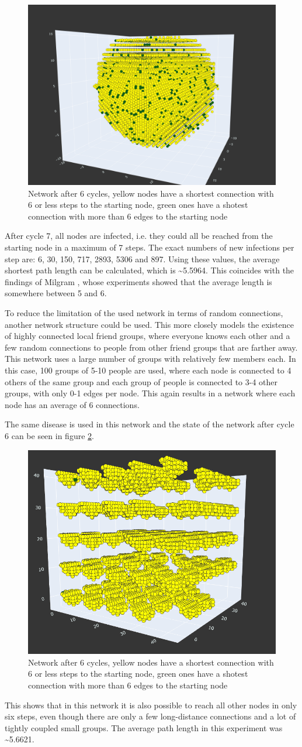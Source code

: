 \begin{figure}
    \centering
    \includegraphics[width=0.5\linewidth]{images/small_world_network.png}
    \caption{Network after 6 cycles, yellow nodes have a shortest connection with 6 or less steps to the starting node,
    green ones have a shotest connection with more than 6 edges to the starting node}
    \label{fig:small_world_network}
\end{figure}

After cycle 7, all nodes are infected, i.e. they could all be reached from the starting node in a maximum of 7 steps. The exact numbers of new infections per step are: 6, 30, 150, 717, 2893, 5306 and 897. Using these values, the average shortest path length can be calculated, which is \textasciitilde 5.5964. This coincides with the findings of Milgram \cite{smallWorld}, whose experiments showed that the average length is somewhere between 5 and 6.

To reduce the limitation of the used network in terms of random connections, another network structure could be used. This more closely models the existence of highly connected local friend groups, where everyone knows each other and a few random connections to people from other friend groups that are farther away. This network uses a large number of groups with relatively few members each. In this case, 100 groups of 5-10 people are used, where each node is connected to 4 others of the same group and each group of people is connected to 3-4 other groups, with only 0-1 edges per node. This again results in a network where each node has an average of 6 connections.

The same disease is used in this network and the state of the network after cycle 6 can be seen in figure \ref{fig:small_world_groups}.

\begin{figure}
    \centering
    \includegraphics[width=0.5\linewidth]{images/small_world_groups.png}
    \caption{Network after 6 cycles, yellow nodes have a shortest connection with 6 or less steps to the starting node,
    green ones have a shotest connection with more than 6 edges to the starting node}
    \label{fig:small_world_groups}
\end{figure}

This shows that in this network it is also possible to reach all other nodes in only six steps, even though there are only a few long-distance connections and a lot of tightly coupled small groups. The average path length in this experiment was \textasciitilde 5.6621.


